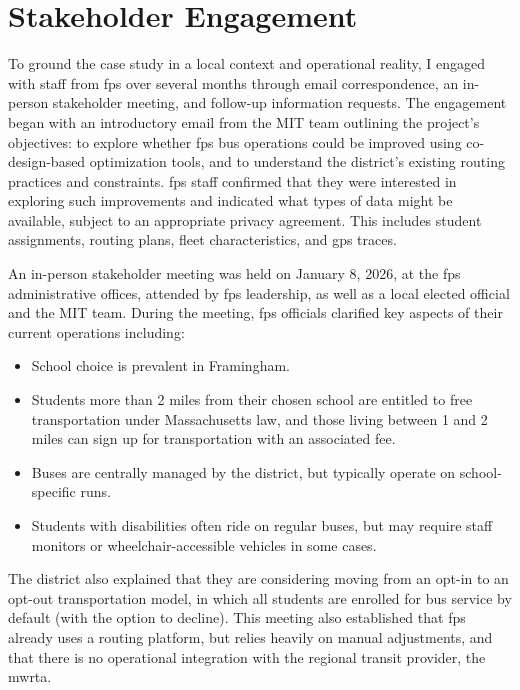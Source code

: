 \chapter{Stakeholder Engagement}
\label{ap:stakeholder}

To ground the case study in a local context and operational reality, I engaged with staff from \gls{fps} over several months through email correspondence, an in-person stakeholder meeting, and follow-up information requests. The engagement began with an introductory email from the MIT team outlining the project's objectives: to explore whether \gls{fps} bus operations could be improved using co-design-based optimization tools, and to understand the district's existing routing practices and constraints. \Gls{fps} staff confirmed that they were interested in exploring such improvements and indicated what types of data might be available, subject to an appropriate privacy agreement. This includes student assignments, routing plans, fleet characteristics, and \gls{gps} traces.

An in-person stakeholder meeting was held on January 8, 2026, at the \gls{fps} administrative offices, attended by \gls{fps} leadership, as well as a local elected official and the MIT team. During the meeting, \gls{fps} officials clarified key aspects of their current operations including:

\begin{itemize}
    \item School choice is prevalent in Framingham.
    \item Students more than 2 miles from their chosen school are entitled to free transportation under Massachusetts law, and those living between 1 and 2 miles can sign up for transportation with an associated fee.
    \item Buses are centrally managed by the district, but typically operate on school-specific runs.
    \item Students with disabilities often ride on regular buses, but may require staff monitors or wheelchair-accessible vehicles in some cases.
\end{itemize}

The district also explained that they are considering moving from an opt-in to an opt-out transportation model, in which all students are enrolled for bus service by default (with the option to decline). This meeting also established that \gls{fps} already uses a routing platform, but relies heavily on manual adjustments, and that there is no operational integration with the regional transit provider, the \gls{mwrta}.

